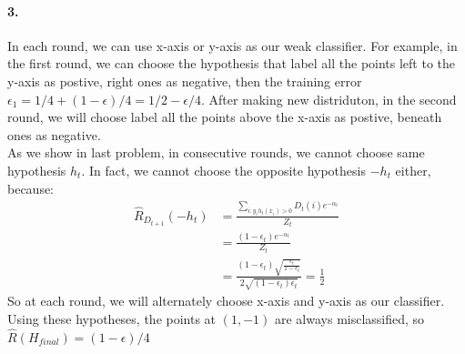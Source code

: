 \documentclass[a4paper]{article}
\begin{document}
    \paragraph{3.}
        In each round, we can use x-axis or y-axis as our weak classifier. For example, in the first round, we can choose the hypothesis that label all the points left to the y-axis as postive, right ones as negative, then the training error $\epsilon_1=1/4+(1-\epsilon)/4=1/2-\epsilon/4$. After making new distriduton, in the second round, we will choose label all the points above the x-axis as postive, beneath ones as negative.\\
        As we show in last problem, in consecutive rounds, we cannot choose same hypothesis $h_t$. In fact, we cannot choose the opposite hypothesis $-h_t$ either, because:
            \begin{equation} \label{eq4}
                \begin{split}
                    \hat{R}_{D_{t+1}}(-h_t) &= \frac{\sum\limits_{i:y_i h_t(x_i)>0}D_t(i)e^{-\alpha_t}}{Z_t} \\                                           
                                           &= \frac{(1-\epsilon_{t})e^{-\alpha_t}}{Z_t} \\
                                           &= \frac{(1-\epsilon_{t}) \sqrt{\frac{\epsilon_t}{1-\epsilon_t}}}{2\sqrt{(1-\epsilon_t)\epsilon_t}} = \frac{1}{2}
                \end{split}
            \end{equation}
        So at each round, we will alternately choose x-axis and y-axis as our classifier. Using these hypotheses, the points at $(1,-1)$ are always misclassified, so $\hat{R}(H_{final})=(1-\epsilon)/4$
\end{document}
